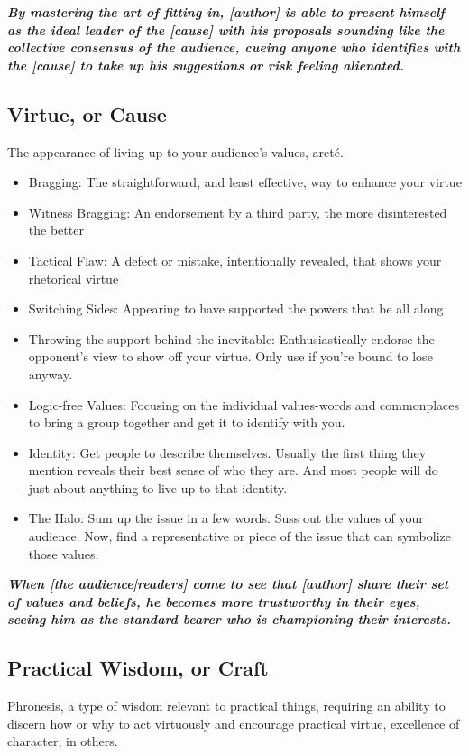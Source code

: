 \textbf{\emph{By mastering the art of fitting in, [author] is able to present himself as the ideal leader of the [cause] with his proposals sounding like the collective consensus of the audience, cueing anyone who identifies with the [cause] to take up his suggestions or risk feeling alienated. 
}}
\subsection{Virtue, or Cause}
The appearance of living up to your audience's values, areté.
\begin{itemize}
	\item Bragging: The straightforward, and least effective, way to enhance your virtue
	\item Witness Bragging: An endorsement by a third party, the more disinterested the better
	\item Tactical Flaw: A defect or mistake, intentionally revealed, that shows your rhetorical virtue
	\item Switching Sides: Appearing to have supported the powers that be all along
	\item Throwing the support behind the inevitable: Enthusiastically endorse the opponent's view to show off your virtue. Only use if you're bound to lose anyway.
	\item Logic-free Values: Focusing on the individual values-words and commonplaces to bring a group together and get it to identify with you.
	\item Identity: Get people to describe themselves. Usually the first thing they mention reveals their best sense of who they are. And most people will do just about anything to live up to that identity.
	\item The Halo: Sum up the issue in a few words. Suss out the values of your audience. Now, find a representative or piece of the issue that can symbolize those values.
\end{itemize}

\emph{\textbf{When [the audience|readers] come to see that [author] share their set of values and beliefs, he becomes more trustworthy in their eyes, seeing him as the standard bearer who is championing their interests.}}

\subsection{Practical Wisdom, or Craft}
Phronesis, a type of wisdom relevant to practical things, requiring an ability to discern how or why to act virtuously and encourage practical virtue, excellence of character, in others.

